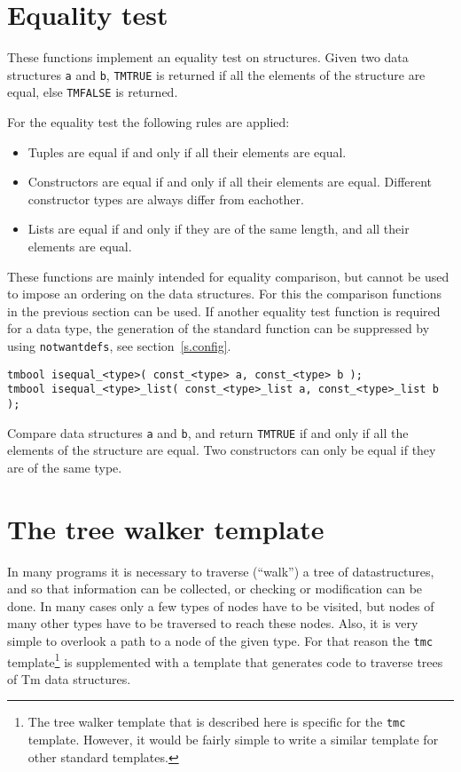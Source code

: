 \section{Equality test}
These functions implement an equality test on structures.
Given two data structures {\tt a} and {\tt b},
{\tt TMTRUE} is returned if all the elements of the structure are equal,
else {\tt TMFALSE} is returned.
\par
For the equality test the following rules are applied:
\begin{itemize}
\item
Tuples are equal if and only if all their elements are equal.
\item
Constructors are equal if and only if all their elements are equal.
Different constructor types are always differ from eachother.
\item
Lists are equal if and only if they are of the same length, and all their elements are equal.
\end{itemize}
\par
These functions are mainly intended for equality comparison,
but cannot be used to impose an ordering on the data structures.
For this the comparison functions in the previous section can be used.
If another equality test function is required for a data type,
the generation of the standard function can be suppressed by
using {\tt notwantdefs}, see section~\ref{s.config}.
\begin{verbatim}
tmbool isequal_<type>( const_<type> a, const_<type> b );
tmbool isequal_<type>_list( const_<type>_list a, const_<type>_list b );
\end{verbatim}
\begin{desc}
Compare data structures {\tt a} and {\tt b}, and return {\tt TMTRUE}
if and only if all the elements of the structure are equal.
Two constructors can only be equal if they are of the same type.
\end{desc}
\section{The tree walker template}
\label{s.treewalk}
In many programs it is necessary to traverse (``walk'') a tree of
datastructures, and so that information can be collected, or checking
or modification can be done. In many cases only a few types of nodes
have to be visited, but nodes of many other types have to be traversed
to reach these nodes. Also, it is very simple to overlook a path to a node
of the given type. For that reason the \verb'tmc' template\footnote{The
tree walker template that is described here is specific for the {\tt tmc}
template. However, it would be fairly simple to write a similar template
for other standard templates.} is supplemented with a template that
generates code to traverse trees of Tm data structures.

